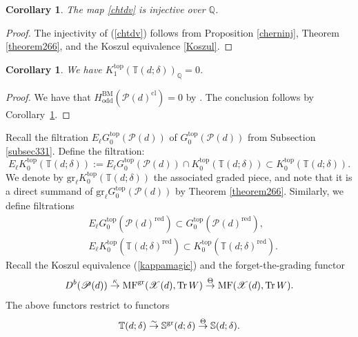 \documentclass [11pt,oneside,a4paper,mathscr]{amsart}
\newtheorem{cor}[thm]{Corollary}
\theoremstyle{definition}
\newcommand{\X}{\mathscr{X}}
\newcommand{\Tr}{\mathop{\rm Tr}}
\begin{document}
\begin{cor}\label{cor615bis}
    The map \eqref{chtdv} is injective over $\mathbb{Q}$. 
\end{cor}

\begin{proof}
 The injectivity of (\ref{chtdv}) follows from Proposition \ref{cherninj}, Theorem \ref{theorem266}, and the Koszul equivalence \eqref{Koszul}.
\end{proof}


\begin{cor}\label{cor615}
    We have $K^{\mathrm{top}}_1(\mathbb{T}(d; \delta))_{\mathbb{Q}}=0$.
\end{cor}
\begin{proof}
 We have that $H^{\mathrm{BM}}_{\mathrm{odd}}(\mathscr{P}(d)^{\mathrm{cl}})=0$ by \cite[Theorem A]{Dav}. The conclusion follows by Corollary~\ref{cor615bis}.
\end{proof}

Recall the filtration $E_\ell G^{\mathrm{top}}_0(\mathscr{P}(d))$ of $G^{\mathrm{top}}_0(\mathscr{P}(d))$ from Subsection \ref{subsec331}. Define the filtration:
\[E_\ell K^{\mathrm{top}}_0(\mathbb{T}(d; \delta)):=E_\ell G^{\mathrm{top}}_0(\mathscr{P}(d))\cap K^{\mathrm{top}}_0(\mathbb{T}(d; \delta))\subset K^{\mathrm{top}}_0(\mathbb{T}(d; \delta)).\]
We denote by $\mathrm{gr}_\ell K^{\mathrm{top}}_0(\mathbb{T}(d; \delta))$ the associated graded piece, and note that it is a direct summand of $\mathrm{gr}_\ell G^{\mathrm{top}}_0(\mathscr{P}(d))$ by Theorem \ref{theorem266}. 
Similarly, we define filtrations 
\begin{align*}
&E_\ell G^{\mathrm{top}}_0(\mathscr{P}(d)^{\mathrm{red}})\subset G^{\mathrm{top}}_0(\mathscr{P}(d)^{\mathrm{red}}), \\ 
&E_\ell 
K^{\mathrm{top}}_0(\mathbb{T}(d; \delta)^{\mathrm{red}}
)\subset K^{\mathrm{top}}_0(\mathbb{T}(d; \delta)^{\mathrm{red}}).
\end{align*}
Recall the Koszul equivalence (\ref{kappamagic}) and the
forget-the-grading functor 
\begin{align*}
  D^b(\mathscr{P}(d)) \stackrel{\kappa}{\to} 
  \mathrm{MF}^{\rm{gr}}(\X(d), \Tr W) \stackrel{\Theta}{\to}
  \mathrm{MF}(\X(d), \Tr W). 
\end{align*}
The above functors restrict to functors 
\begin{align*}
    \mathbb{T}(d; \delta) \stackrel{\sim}{\to}
    \mathbb{S}^{\rm{gr}}(d; \delta) \stackrel{\Theta}{\to}
    \mathbb{S}(d; \delta). 
\end{align*}
\end{document}
